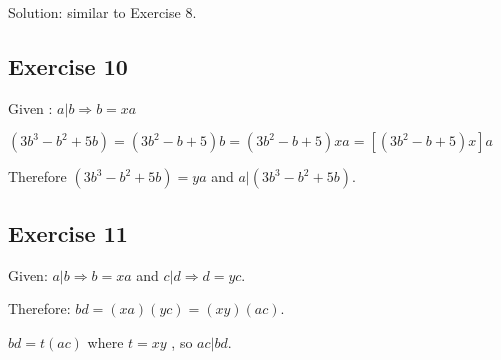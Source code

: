 \documentclass[a4paper]{article}
\begin{document}
Solution: similar to Exercise 8.

\subsection{Exercise 10}

Given : $a|b \Rightarrow b = xa$

$ (3b^3 - b^2 + 5b) = (3b^2 - b + 5)b = (3b^2 - b + 5)xa =
\left[(3b^2 - b + 5)x\right]a$

Therefore $(3b^3 - b^2 + 5b) = ya$ and $a|(3b^3 - b^2 + 5b)$.

\subsection{Exercise 11}

Given: $a|b \Rightarrow b = xa$ and $c|d \Rightarrow d = yc$.

Therefore: $bd = (xa)(yc) = (xy)(ac)$.

$bd = t(ac)$ where $t = xy$ , so $ac|bd$.
\end{document}
